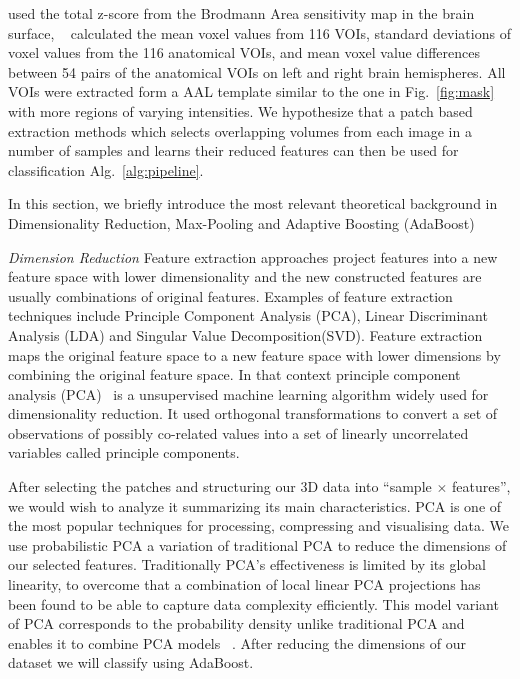 \documentclass[authoryear,preprint,revi	ew,12pt]{elsarticle}
\begin{document}
\citep{kakimoto2011new} used the total z-score from the Brodmann Area sensitivity map in the brain surface, ~\citep{lu2017early} calculated the mean voxel values from 116 VOIs, standard deviations of voxel values from the 116 anatomical VOIs, and mean voxel value differences between 54 pairs of the anatomical VOIs on left and right brain hemispheres. All VOIs were extracted form a AAL template similar to the one in Fig.~\ref{fig:mask} with more regions of varying intensities. We hypothesize that a patch based extraction methods which selects overlapping volumes from each image in a number of samples and learns their reduced features can then be used for classification Alg.~\ref{alg:pipeline}.  

In this section, we briefly introduce the most relevant theoretical background in Dimensionality Reduction, Max-Pooling and Adaptive Boosting (AdaBoost)   

\textit{Dimension Reduction}
Feature extraction approaches project features into a new feature space with lower dimensionality and the new constructed features are usually combinations of original features. Examples of feature extraction techniques include Principle Component Analysis (PCA), Linear Discriminant Analysis (LDA) and Singular Value Decomposition(SVD). Feature extraction maps the original feature space to a new feature space with lower dimensions by combining the original feature space. In that context principle component analysis (PCA)~\citep{jolliffe2002principal} is a unsupervised machine learning algorithm widely used for dimensionality reduction. It used orthogonal transformations to convert a set of observations of possibly co-related values into a set of linearly uncorrelated variables called principle components. 

After selecting the patches and structuring our 3D data into ``sample $ \times $ features'', we would wish to analyze it summarizing its main characteristics. PCA is one of the most popular techniques for processing, compressing and visualising data. We use probabilistic PCA a variation of traditional PCA to reduce the dimensions of our selected features. Traditionally PCA's effectiveness is limited by its global linearity, to overcome that a combination of local linear PCA projections has been found to be able to capture data complexity efficiently. This model variant of PCA corresponds to the probability density unlike traditional PCA and enables it to combine PCA models~ \citep{tipping1999mixtures}. After reducing the dimensions of our dataset we will classify using AdaBoost. 
\end{document}

